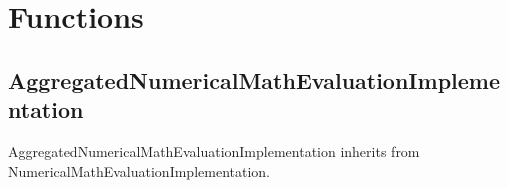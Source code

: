 

\newpage
{}
\section{Functions}

\subsection{AggregatedNumericalMathEvaluationImplementation}

AggregatedNumericalMathEvaluationImplementation inherits from NumericalMathEvaluationImplementation.

